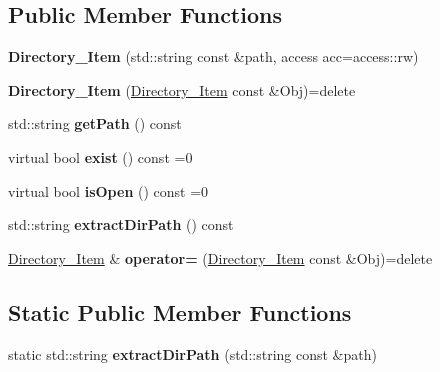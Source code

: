\subsection*{Public Member Functions}
\begin{DoxyCompactItemize}
\item 
\hypertarget{classstb_1_1Directory__Item_ae9f8cccada1d4d7387f1c7f2dff127cf}{{\bfseries Directory\+\_\+\+Item} (std\+::string const \&path, access acc=access\+::rw)}\label{classstb_1_1Directory__Item_ae9f8cccada1d4d7387f1c7f2dff127cf}

\item 
\hypertarget{classstb_1_1Directory__Item_a116bedc7568c76c1b6d30584f55c3337}{{\bfseries Directory\+\_\+\+Item} (\hyperlink{classstb_1_1Directory__Item}{Directory\+\_\+\+Item} const \&Obj)=delete}\label{classstb_1_1Directory__Item_a116bedc7568c76c1b6d30584f55c3337}

\item 
\hypertarget{classstb_1_1Directory__Item_a13c64be0ccdaa92d4ff3d48cd5803114}{std\+::string {\bfseries get\+Path} () const }\label{classstb_1_1Directory__Item_a13c64be0ccdaa92d4ff3d48cd5803114}

\item 
\hypertarget{classstb_1_1Directory__Item_a2667a231a05f6e0b9cb5105fbb615cff}{virtual bool {\bfseries exist} () const =0}\label{classstb_1_1Directory__Item_a2667a231a05f6e0b9cb5105fbb615cff}

\item 
\hypertarget{classstb_1_1Directory__Item_a31e3bf75d364fa9a3ffe5de6f184bbbf}{virtual bool {\bfseries is\+Open} () const =0}\label{classstb_1_1Directory__Item_a31e3bf75d364fa9a3ffe5de6f184bbbf}

\item 
\hypertarget{classstb_1_1Directory__Item_a20332728a23f207b7bf186d3530fb67c}{std\+::string {\bfseries extract\+Dir\+Path} () const }\label{classstb_1_1Directory__Item_a20332728a23f207b7bf186d3530fb67c}

\item 
\hypertarget{classstb_1_1Directory__Item_a88da183ca70604c8290d40e0ebec4389}{\hyperlink{classstb_1_1Directory__Item}{Directory\+\_\+\+Item} \& {\bfseries operator=} (\hyperlink{classstb_1_1Directory__Item}{Directory\+\_\+\+Item} const \&Obj)=delete}\label{classstb_1_1Directory__Item_a88da183ca70604c8290d40e0ebec4389}

\end{DoxyCompactItemize}
\subsection*{Static Public Member Functions}
\begin{DoxyCompactItemize}
\item 
\hypertarget{classstb_1_1Directory__Item_a24bf16a204499f1bd8e7bc9352aac0f0}{static std\+::string {\bfseries extract\+Dir\+Path} (std\+::string const \&path)}\label{classstb_1_1Directory__Item_a24bf16a204499f1bd8e7bc9352aac0f0}

\end{DoxyCompactItemize}
